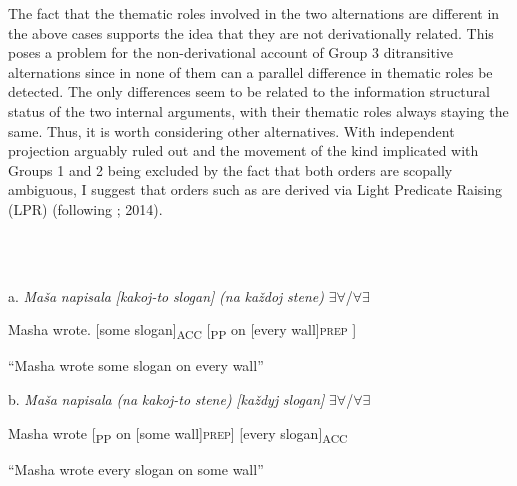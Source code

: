 \documentclass[output=paper,modfonts, nonflat]{langsci/langscibook}
\begin{document}
The fact that the thematic roles involved in the two alternations are different in the above cases supports the idea that they are not derivationally related. This poses a problem for the non-derivational account of Group 3 ditransitive alternations since in none of them can a parallel difference in thematic roles be detected. The only differences seem to be related to the information structural status of the two internal arguments, with their thematic roles always staying the same. Thus, it is worth considering other alternatives. With independent projection arguably ruled out and the movement of the kind implicated with Groups 1 and 2 being excluded by the fact that both orders are scopally ambiguous, I suggest that orders such as  are derived via Light Predicate Raising (LPR) (following \citealt{Larson1989}; 2014).

\begin{styleinnerExample}
\ea%
    \label{ex:key:59}
    \gll\\
        \\
    \glt
    \z

          a.  \textit{Maša}  \textit{napisala} \textit{[kakoj-to} \textit{slogan]}         \textit{(na} \textit{každoj} \textit{stene)} ${\exists}{\forall}$/${\forall}{\exists}$
\end{styleinnerExample}

\begin{styleinnerExample}
    Masha wrote.    [some     slogan]\textsubscript{ACC} [\textsubscript{PP} on [every wall]\textsc{prep} ]
\end{styleinnerExample}

\begin{styleinnerExample}
    “Masha wrote some slogan on every wall”
\end{styleinnerExample}

\begin{styleinnerExample}
  b.  \textit{Maša} \textit{napisala}  \textit{(na}  \textit{kakoj-to} \textit{stene)}        \textit{[každyj} \textit{slogan]}  ${\exists}{\forall}$/${\forall}{\exists}$
\end{styleinnerExample}

\begin{styleinnerExample}
    Masha wrote [\textsubscript{PP} on [some     wall]\textsc{prep}] [every slogan]\textsubscript{ACC}
\end{styleinnerExample}

\begin{styleinnerExample}
    “Masha wrote every slogan on some wall”
\end{styleinnerExample}
\end{document}
